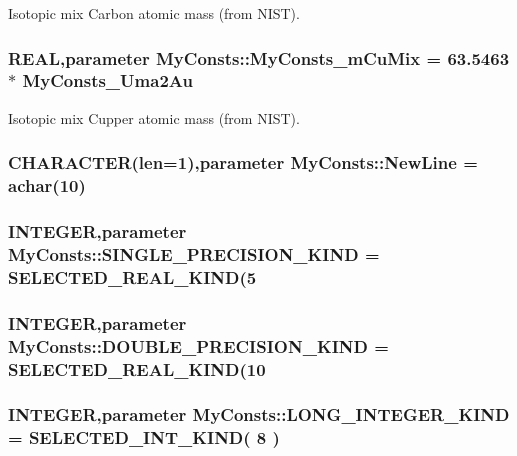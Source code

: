 Isotopic mix Carbon atomic mass (from NIST). \hypertarget{namespace_my_consts_a3e9915df2fca44d18350e2829d68c34a}{
\subsubsection[{MyConsts\_\-mCuMix}]{\setlength{\rightskip}{0pt plus 5cm}REAL,parameter {\bf MyConsts::MyConsts\_\-mCuMix} = 63.5463 $\ast$ {\bf MyConsts\_\-Uma2Au}}}
\label{namespace_my_consts_a3e9915df2fca44d18350e2829d68c34a}


Isotopic mix Cupper atomic mass (from NIST). \hypertarget{namespace_my_consts_a9a8e9aee6b2dd00efffbdb0957a48628}{
\subsubsection[{NewLine}]{\setlength{\rightskip}{0pt plus 5cm}CHARACTER(len=1),parameter {\bf MyConsts::NewLine} = achar(10)}}
\label{namespace_my_consts_a9a8e9aee6b2dd00efffbdb0957a48628}
\hypertarget{namespace_my_consts_a293023fa7183e7f030a565aab4319d39}{
\subsubsection[{SINGLE\_\-PRECISION\_\-KIND}]{\setlength{\rightskip}{0pt plus 5cm}INTEGER,parameter {\bf MyConsts::SINGLE\_\-PRECISION\_\-KIND} = SELECTED\_\-REAL\_\-KIND(5}}
\label{namespace_my_consts_a293023fa7183e7f030a565aab4319d39}
\hypertarget{namespace_my_consts_a692521408a6d0a60e684c2dc67c804ab}{
\subsubsection[{DOUBLE\_\-PRECISION\_\-KIND}]{\setlength{\rightskip}{0pt plus 5cm}INTEGER,parameter {\bf MyConsts::DOUBLE\_\-PRECISION\_\-KIND} = SELECTED\_\-REAL\_\-KIND(10}}
\label{namespace_my_consts_a692521408a6d0a60e684c2dc67c804ab}
\hypertarget{namespace_my_consts_a2d3348d585376d97fd760ceea81f0b65}{
\subsubsection[{LONG\_\-INTEGER\_\-KIND}]{\setlength{\rightskip}{0pt plus 5cm}INTEGER,parameter {\bf MyConsts::LONG\_\-INTEGER\_\-KIND} = SELECTED\_\-INT\_\-KIND( 8 )}}
